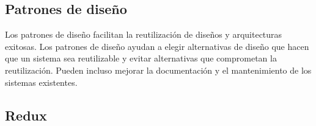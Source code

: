 \subsection{Patrones de diseño}
Los patrones de diseño facilitan la reutilización de diseños y arquitecturas exitosas. Los patrones de diseño ayudan a elegir alternativas de diseño que hacen que un sistema sea reutilizable y evitar alternativas que comprometan la reutilización. Pueden incluso mejorar la documentación y el mantenimiento de los sistemas existentes.

\subsection{Redux}
